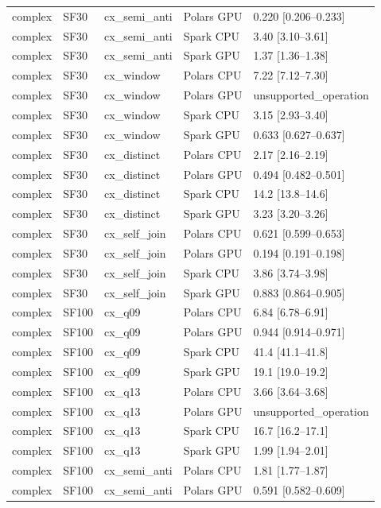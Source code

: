 \begin{longtable}{lllll}
complex & SF30 & cx\_semi\_anti & Polars GPU & 0.220 [0.206--0.233] \\
complex & SF30 & cx\_semi\_anti & Spark CPU & 3.40 [3.10--3.61] \\
complex & SF30 & cx\_semi\_anti & Spark GPU & 1.37 [1.36--1.38] \\
complex & SF30 & cx\_window & Polars CPU & 7.22 [7.12--7.30] \\
complex & SF30 & cx\_window & Polars GPU & unsupported\_operation \\
complex & SF30 & cx\_window & Spark CPU & 3.15 [2.93--3.40] \\
complex & SF30 & cx\_window & Spark GPU & 0.633 [0.627--0.637] \\
complex & SF30 & cx\_distinct & Polars CPU & 2.17 [2.16--2.19] \\
complex & SF30 & cx\_distinct & Polars GPU & 0.494 [0.482--0.501] \\
complex & SF30 & cx\_distinct & Spark CPU & 14.2 [13.8--14.6] \\
complex & SF30 & cx\_distinct & Spark GPU & 3.23 [3.20--3.26] \\
complex & SF30 & cx\_self\_join & Polars CPU & 0.621 [0.599--0.653] \\
complex & SF30 & cx\_self\_join & Polars GPU & 0.194 [0.191--0.198] \\
complex & SF30 & cx\_self\_join & Spark CPU & 3.86 [3.74--3.98] \\
complex & SF30 & cx\_self\_join & Spark GPU & 0.883 [0.864--0.905] \\
complex & SF100 & cx\_q09 & Polars CPU & 6.84 [6.78--6.91] \\
complex & SF100 & cx\_q09 & Polars GPU & 0.944 [0.914--0.971] \\
complex & SF100 & cx\_q09 & Spark CPU & 41.4 [41.1--41.8] \\
complex & SF100 & cx\_q09 & Spark GPU & 19.1 [19.0--19.2] \\
complex & SF100 & cx\_q13 & Polars CPU & 3.66 [3.64--3.68] \\
complex & SF100 & cx\_q13 & Polars GPU & unsupported\_operation \\
complex & SF100 & cx\_q13 & Spark CPU & 16.7 [16.2--17.1] \\
complex & SF100 & cx\_q13 & Spark GPU & 1.99 [1.94--2.01] \\
complex & SF100 & cx\_semi\_anti & Polars CPU & 1.81 [1.77--1.87] \\
complex & SF100 & cx\_semi\_anti & Polars GPU & 0.591 [0.582--0.609] \\

\end{longtable}
